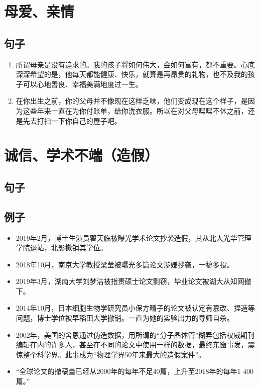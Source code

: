 \section{母爱、亲情}
\subsection{句子}
\begin{enumerate}
\item 所谓母亲是没有追求的。我的孩子将如何伟大，会如何富有，都不重要。心底深深希望的是，他每天都能健康、快乐，就算是再昂贵的礼物，也不及我的孩子可以心地善良、幸福美满地度过一生。
\item 在你出生之前，你的父母并不像现在这样乏味，他们变成现在这个样子，是因为这些年来一直在为你付账单，给你洗衣服。所以在对父母喋喋不休之前，还是先去打扫一下你自己的屋子吧。

\end{enumerate}

\section{诚信、学术不端（造假）}
\subsection{句子}
\subsection{例子}
\begin{itemize}
\item 2019年2月，博士生演员翟天临被曝光学术论文抄袭造假，其从北大光华管理学院退站，北影撤销其学位。
\item 2018年10月，南京大学教授梁莹被曝光多篇论文涉嫌抄袭，一稿多投。
\item 2019年3月，湖南大学刘梦洁被指责硕士论文剽窃，毕业论文被湖大从知网撤下。
\item 2014年10月，日本细胞生物学研究员小保方晴子的论文被认定有篡改、捏造等问题，博士学位被早稻田大学撤销。一直为她的实验出力的导师自杀。
\item 2002年，美国的舍恩通过伪造数据，用所谓的“分子晶体管”糊弄包括权威期刊编辑在内的许多人，甚至在不同的论文中使用一样的数据，最终东窗事发，震惊整个科学界。此事成为“物理学界50年来最大的造假案件”。
\item “全球论文的撤稿量已经从2000年的每年不足40篇，上升至2018年的每年1 400篇。”
\end{itemize}


